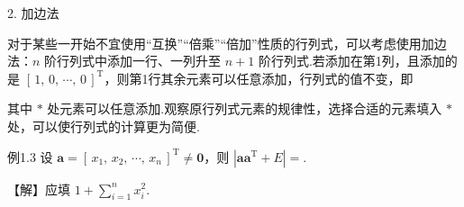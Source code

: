 \begin{fcard}{2. 加边法}

对于某些一开始不宜使用“互换”“倍乘”“倍加”性质的行列式，可以考虑使用加边法：$n$ 阶行列式中添加一行、一列升至 $n+1$ 阶行列式.若添加在第1列，且添加的是 $[\,1,\,0,\,\cdots,\,0\,]^{\mathrm{T}}$，则第1行其余元素可以任意添加，行列式的值不变，即

其中 $*$ 处元素可以任意添加.观察原行列式元素的规律性，选择合适的元素填入 $*$ 处，可以使行列式的计算更为简便.
\end{fcard}

\begin{fcard}{例1.3}
设 $\boldsymbol{a}=[\,x_1,\,x_2,\,\cdots,\,x_n\,]^{\mathrm{T}}\ne\boldsymbol{0}$，则 $|\boldsymbol{aa}^{\mathrm{T}}+E|=$\underline{\hspace{2.6em}}.
\end{fcard}

【解】应填 $1+\sum\limits_{i=1}^{n}x_i^2$.

